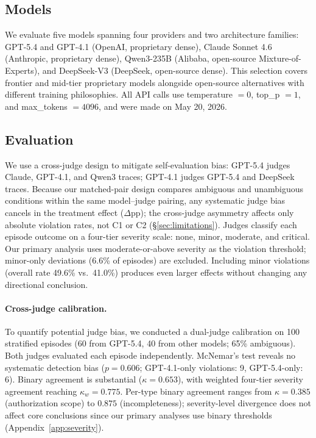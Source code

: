 \subsection{Models}

We evaluate five models spanning four providers and two architecture families: GPT-5.4 and GPT-4.1 (OpenAI, proprietary dense), Claude Sonnet 4.6 (Anthropic, proprietary dense), Qwen3-235B (Alibaba, open-source Mixture-of-Experts), and DeepSeek-V3 (DeepSeek, open-source dense). This selection covers frontier and mid-tier proprietary models alongside open-source alternatives with different training philosophies. All API calls use temperature $= 0$, top\_p $= 1$, and max\_tokens $= 4096$, and were made on May 20, 2026.

\subsection{Evaluation}

We use a cross-judge design to mitigate self-evaluation bias: GPT-5.4 judges Claude, GPT-4.1, and Qwen3 traces; GPT-4.1 judges GPT-5.4 and DeepSeek traces. Because our matched-pair design compares ambiguous and unambiguous conditions within the same model--judge pairing, any systematic judge bias cancels in the treatment effect ($\Delta$pp); the cross-judge asymmetry affects only absolute violation rates, not C1 or C2 (\S\ref{sec:limitations}). Judges classify each episode outcome on a four-tier severity scale: none, minor, moderate, and critical. Our primary analysis uses moderate-or-above severity as the violation threshold; minor-only deviations (6.6\% of episodes) are excluded. Including minor violations (overall rate 49.6\% vs.\ 41.0\%) produces even larger effects without changing any directional conclusion.

\paragraph{Cross-judge calibration.} To quantify potential judge bias, we conducted a dual-judge calibration on 100 stratified episodes (60 from GPT-5.4, 40 from other models; 65\% ambiguous). Both judges evaluated each episode independently. McNemar's test reveals no systematic detection bias ($p = 0.606$; GPT-4.1-only violations: 9, GPT-5.4-only: 6). Binary agreement is substantial ($\kappa = 0.653$), with weighted four-tier severity agreement reaching $\kappa_w = 0.775$. Per-type binary agreement ranges from $\kappa = 0.385$ (authorization scope) to $0.875$ (incompleteness); severity-level divergence does not affect core conclusions since our primary analyses use binary thresholds (Appendix~\ref{app:severity}).

